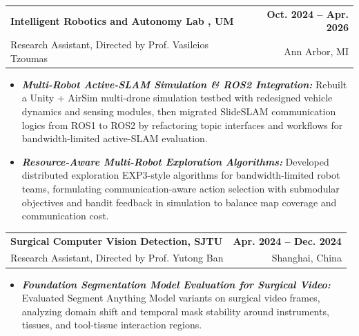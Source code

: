 \documentclass[11pt,letterpaper]{article}
\makeatletter
\newcommand{\resumeSubheading}[4]{
    \begin{tabularx}{\textwidth}{@{}Xr@{}}
        \textbf{#1} & \textbf{#2} \\
        #3 & #4 \\
    \end{tabularx}
}
\newcommand{\resumeItem}[1]{
    \item #1
}
\makeatother
\begin{document}
\resumeSubheading
{Intelligent Robotics and Autonomy Lab , UM}
{Oct. 2024 -- Apr. 2026}
{\hspace*{1.4em}Research Assistant, Directed by Prof. Vasileios Tzoumas}
{Ann Arbor, MI}
\begin{itemize}[leftmargin=2.4em, itemsep=0.5pt, topsep=0pt]
    \small
    \resumeItem{\textbf{\textit{Multi-Robot Active-SLAM Simulation \& ROS2 Integration:}} Rebuilt a Unity + AirSim multi-drone simulation testbed with redesigned vehicle dynamics and sensing modules, then migrated SlideSLAM communication logics from ROS1 to ROS2 by refactoring topic interfaces and workflows for bandwidth-limited active-SLAM evaluation.}
    \resumeItem{\textbf{\textit{Resource-Aware Multi-Robot Exploration Algorithms:}} Developed distributed exploration EXP3-style algorithms for bandwidth-limited robot teams, formulating communication-aware action selection with submodular objectives and bandit feedback in simulation to balance map coverage and communication cost.}
\end{itemize}

\resumeSubheading
{Surgical Computer Vision Detection, SJTU}
{Apr. 2024 -- Dec. 2024}
{Research Assistant, Directed by Prof. Yutong Ban}
{Shanghai, China}
\begin{itemize}[leftmargin=2.4em, itemsep=0.5pt, topsep=0pt]
    \small
    \resumeItem{\textbf{\textit{Foundation Segmentation Model Evaluation for Surgical Video:}} Evaluated Segment Anything Model variants on surgical video frames, analyzing domain shift and temporal mask stability around instruments, tissues, and tool-tissue interaction regions.}
\end{itemize}
\end{document}
